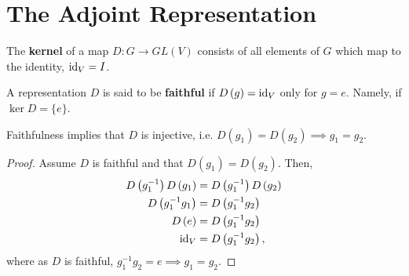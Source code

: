 
\newcommand{\Ad}{\text{Ad}}

\section{The Adjoint Representation}

\begin{definition}
    The \textbf{kernel} of a map $D : G \to GL \left( V \right)$ consists of all elements of $G$ which map to the identity, $\text{id}_V = I$.
\end{definition}

\begin{definition}
    A representation $D$ is said to be \textbf{faithful} if $D \left( g \right) = \text{id}_V$ only for $g = e$. Namely, if $\ker D = \{e\} $.
\end{definition}

Faithfulness implies that $D$ is injective, i.e. $D\left( g_1 \right) = D\left( g_2 \right) \implies g_1 = g_2$.
\begin{proof}
    Assume $D$ is faithful and that $D \left( g_1 \right) = D\left( g_2 \right) $. Then,
    \begin{align}
        D\left( g^{-1}_1 \right) D\left( g_1 \right) &= D\left( g_1^{-1} \right) D\left( g_2 \right) \\
        D \left( g^{-1}_1 g_1 \right) &= D \left( g_1^{-1} g_2 \right)  \\
        D \left( e \right) &= D \left( g_1^{-1} g_2 \right) \\
        \text{id}_V &= D \left( g_1^{-1} g_2 \right)
    ,\end{align}
    where as $D$ is faithful, $g_1^{-1} g_2 = e \implies g_1 = g_2$.
\end{proof}

